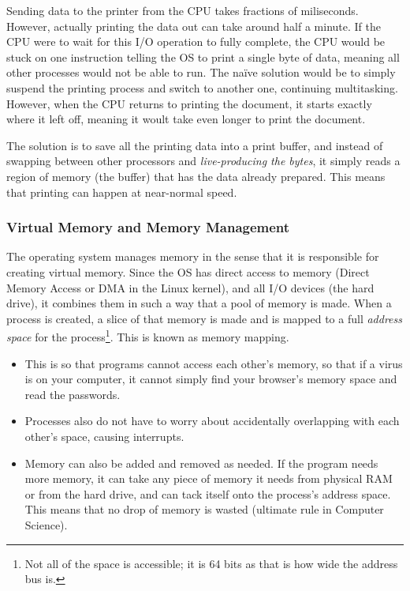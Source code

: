 \documentclass[../main.tex]{subfiles}
\begin{document}
Sending data to the printer from the CPU takes fractions of miliseconds. However, actually printing the data out can take around half a minute. If the CPU were to wait for this I/O operation to fully complete, the CPU would be stuck on one instruction telling the OS to print a single byte of data, meaning all other processes would not be able to run. The naïve solution would be to simply suspend the printing process and switch to another one, continuing multitasking. However, when the CPU returns to printing the document, it starts exactly where it left off, meaning it woult take even longer to print the document.

The solution is to save all the printing data into a print buffer, and instead of swapping between other processors and \emph{live-producing the bytes}, it simply reads a region of memory (the buffer) that has the data already prepared. This means that printing can happen at near-normal speed.

\subsubsection{Virtual Memory and Memory Management}
\label{4:sec:virtmem}

The operating system manages memory in the sense that it is responsible for creating virtual memory. Since the OS has direct access to memory (Direct Memory Access or DMA in the Linux kernel), and all I/O devices (the hard drive), it combines them in such a way that a pool of memory is made. When a process is created, a slice of that memory is made and is mapped to a full \emph{address space} for the process\footnote{Not all of the space is accessible; it is 64 bits as that is how wide the address bus is.}. This is known as memory mapping.

\begin{itemize}
    \item This is so that programs cannot access each other's memory, so that if a virus is on your computer, it cannot simply find your browser's memory space and read the passwords. 
    \item Processes also do not have to worry about accidentally overlapping with each other's space, causing interrupts.
    \item Memory can also be added and removed as needed. If the program needs more memory, it can take any piece of memory it needs from physical RAM or from the hard drive, and can tack itself onto the process's address space. This means that no drop of memory is wasted (ultimate rule in Computer Science).
\end{itemize}
\end{document}
